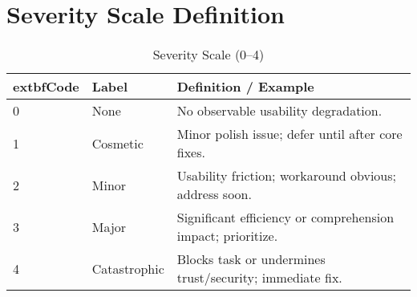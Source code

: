 \documentclass[11pt,a4paper]{article}
\begin{document}
\section{Severity Scale Definition}\label{app:severity}
\begin{table}[h]
	\centering
	\caption{Severity Scale (0--4)}
	\begin{tabular}{|p{1cm}|p{2.6cm}|p{9cm}|}
		\hline
			extbf{Code} & \textbf{Label} & \textbf{Definition / Example} \\
		\hline
		0 & None & No observable usability degradation. \\
		\hline
		1 & Cosmetic & Minor polish issue; defer until after core fixes. \\
		\hline
		2 & Minor & Usability friction; workaround obvious; address soon. \\
		\hline
		3 & Major & Significant efficiency or comprehension impact; prioritize. \\
		\hline
		4 & Catastrophic & Blocks task or undermines trust/security; immediate fix. \\
		\hline
	\end{tabular}
\end{table}
\end{document}
